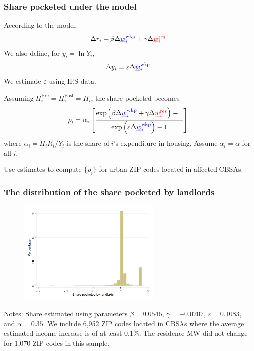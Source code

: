 \documentclass[aspectratio=169, t]{beamer}
\newcommand{\mw}{\underline{w}}
\newcommand{\wkp}{\text{wkp}}
\newcommand{\res}{\text{res}}
\newcommand{\pre}{\text{Pre}}
\newcommand{\post}{\text{Post}}
\begin{document}
\begin{frame}[label = share_pocketed_model]
    \frametitle{Share pocketed under the model}

    According to the model,
    $$
    \Delta r_i = \beta \Delta {\color{blue}\mw_i^{\wkp}} + \gamma \Delta {\color{red}\mw_i^{\res}}
    $$
    We also define, for $y_i = \ln Y_i$,
    $$
    \Delta y_i = \varepsilon \Delta {\color{blue}\mw_i^{\wkp}}
    $$
    We estimate $\varepsilon$ using IRS data. \hyperlink{wages_results}{}

    \pause
    \vspace{3mm}
    Assuming $H^{\pre}_i = H^{\post}_i = H_i$, the share pocketed becomes
    \begin{equation*}
        \rho_i = \alpha_i \left[
                  \frac{\exp \left( \beta \Delta {\color{blue}\mw_i^{\wkp}} 
                                 + \gamma \Delta {\color{red}\mw_i^{\res}} \right) - 1 }
                       {\exp \left( \varepsilon \Delta {\color{blue}\mw_i^{\wkp}}  \right) - 1 }
                         \right]
    \end{equation*}
    where $\alpha_i = H_i R_i / Y_i$ is the share of $i$'s expenditure in housing. Assume $\alpha_i = \alpha$ for all $i$.
    
    \pause
    \vspace{3mm}
    Use estimates to compute $\{\rho_i\}$ for urban ZIP codes located in affected CBSAs.
\end{frame}

\begin{frame}
    \frametitle{The distribution of the share pocketed by landlords}
    
    \vspace{1mm}
    \begin{figure}
        \centering
        \includegraphics[width = 0.62\textwidth]{counterfactuals/output/hist_rho.png}
    \end{figure}   

    \vspace{-1mm}
    \scriptsize
    Notes: Share estimated using parameters $\beta = 0.0546$, $\gamma = -0.0207$, $\varepsilon = 0.1083$, and $\alpha=0.35$.
    We include 6,952 ZIP codes located in CBSAs where the average estimated income increase
    is of at least 0.1\%. 
    The residence MW did not change for 1,070 ZIP codes in this sample.
\end{frame}
\end{document}
